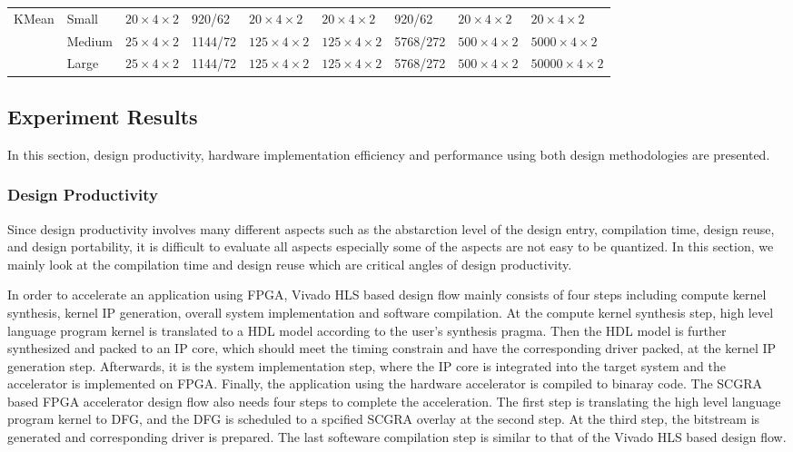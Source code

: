 \begin{table*}[t]
\begin{tabular}{|l|l|l|l|l|l|l|l|l|}
\multirow{3}{*}{KMean} & Small & $20 \times 4 \times 2$ & 920/62 & $20 \times 4 \times 2$ & $20 \times 4 \times 2$ & 920/62 & $20 \times 4 \times 2$ & $20 \times 4 \times 2$ \\ \cline{2-9} 
                 & Medium & $25 \times 4 \times 2$ & 1144/72 & $125 \times 4 \times 2$ & $125 \times 4 \times 2$ & 5768/272 & $500 \times 4 \times 2$ & $5000 \times 4 \times 2$ \\ \cline{2-9} 
                 & Large & $25 \times 4 \times 2$ & 1144/72 & $125 \times 4 \times 2$ & $125 \times 4 \times 2$ & 5768/272 & $500 \times 4 \times 2$ & $50000 \times 4 \times 2$  \\ \hline
\end{tabular}
\end{table*}

\subsection{Experiment Results}
In this section, design productivity, hardware implementation efficiency and performance using both design methodologies are presented. 

\subsubsection{Design Productivity}
Since design productivity involves many different aspects such as the abstarction level of the design entry, compilation time, design reuse, and design portability, it is difficult to evaluate all aspects especially some of the aspects are not easy to be quantized. In this section, we mainly look at the compilation time and design reuse which are critical angles of design productivity.

In order to accelerate an application using FPGA, Vivado HLS based design flow mainly consists of four steps including compute kernel synthesis, kernel IP generation, overall system implementation and software compilation. At the compute kernel synthesis step, high level language program kernel is translated to a HDL model according to the user's synthesis pragma. Then the HDL model is further synthesized and packed to an IP core, which should meet the timing constrain and have the corresponding driver packed, at the kernel IP generation step. Afterwards, it is the system implementation step, where the IP core is integrated into the target system and the accelerator is implemented on FPGA. Finally, the application using the hardware accelerator is compiled to binaray code. The SCGRA based FPGA accelerator design flow also needs four steps to complete the acceleration. The first step is translating the high level language program kernel to DFG, and the DFG is scheduled to a spcified SCGRA overlay at the second step. At the third step, the bitstream is generated and corresponding driver is prepared. The last softeware compilation step is similar to that of the Vivado HLS based design flow. 


